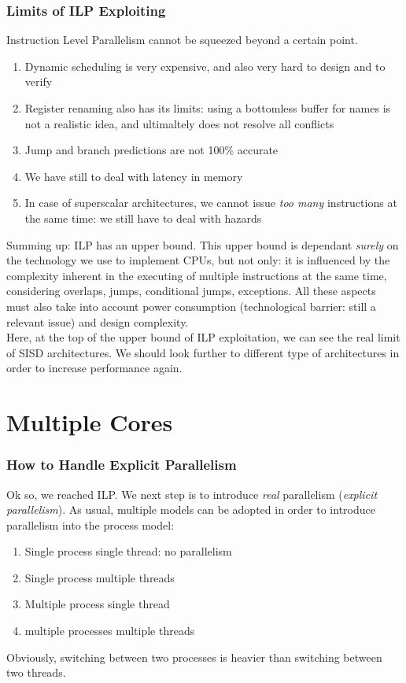 \documentclass[10pt,a4paper]{article}
\begin{document}
		\section{Limits of ILP Exploiting}
			Instruction Level Parallelism cannot be squeezed beyond a certain point.
			\begin{enumerate}
				\item Dynamic scheduling is very expensive, and also very hard to design and to verify
				\item Register renaming also has its limits: using a bottomless buffer for names is not a realistic idea, and ultimaltely does not resolve all conflicts
				\item Jump and branch predictions are not 100\% accurate
				\item We have still to deal with latency in memory
				\item In case of superscalar architectures, we cannot issue \emph{too many} instructions at the same time: we still have to deal with hazards
			\end{enumerate}
			Summing up: ILP has an upper bound. This upper bound is dependant \emph{surely} on the technology we use to implement CPUs, but not only: it is influenced by the complexity inherent in the executing of multiple instructions at the same time, considering overlaps, jumps, conditional jumps, exceptions. All these aspects must also take into account power consumption (technological barrier: still a relevant issue) and design complexity.\\
			Here, at the top of the upper bound of ILP exploitation, we can see the real limit of SISD architectures. We should look further to different type of architectures in order to increase performance again.
			
	\clearpage \part{Multiple Cores}
		\section{How to Handle Explicit Parallelism}
			Ok so, we reached ILP. We next step is to introduce \emph{real} parallelism (\emph{explicit parallelism}). As usual, multiple models can be adopted in order to introduce parallelism into the process model:
			\begin{enumerate}
				\item Single process single thread: no parallelism
				\item Single process multiple threads
				\item Multiple process single thread
				\item multiple processes multiple threads
			\end{enumerate}
			Obviously, switching between two processes is heavier than switching between two threads. 
			
\end{document}
